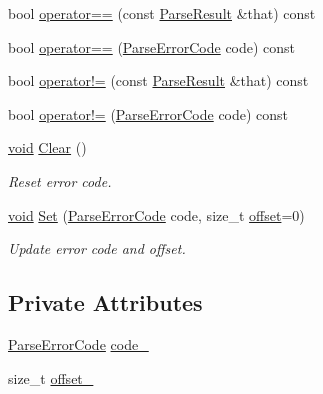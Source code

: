 \begin{DoxyCompactItemize}
bool \hyperlink{structParseResult_a4d98465a5dc6055e367a7ea7089fc73d}{operator==} (const \hyperlink{structParseResult}{Parse\+Result} \&that) const
\item 
bool \hyperlink{structParseResult_a6de18a7e43013b2defc51d892c2cf90f}{operator==} (\hyperlink{group__RAPIDJSON__ERRORS_ga8d4b32dfc45840bca189ade2bbcb6ba7}{Parse\+Error\+Code} code) const
\item 
bool \hyperlink{structParseResult_aa1fcc912cede0ef0526e0cbfcb14e4c2}{operator!=} (const \hyperlink{structParseResult}{Parse\+Result} \&that) const
\item 
bool \hyperlink{structParseResult_afbe78dd07fd1bc09adb1609dda028ee0}{operator!=} (\hyperlink{group__RAPIDJSON__ERRORS_ga8d4b32dfc45840bca189ade2bbcb6ba7}{Parse\+Error\+Code} code) const
\item 
\hyperlink{imgui__impl__opengl3__loader_8h_ac668e7cffd9e2e9cfee428b9b2f34fa7}{void} \hyperlink{structParseResult_a88b6d44f052a19e6436ae6aadc2c40b4}{Clear} ()
\begin{DoxyCompactList}\small\item\em Reset error code. \end{DoxyCompactList}\item 
\hyperlink{imgui__impl__opengl3__loader_8h_ac668e7cffd9e2e9cfee428b9b2f34fa7}{void} \hyperlink{structParseResult_aa81b4a7b776b77216cb752385203a8c1}{Set} (\hyperlink{group__RAPIDJSON__ERRORS_ga8d4b32dfc45840bca189ade2bbcb6ba7}{Parse\+Error\+Code} code, size\+\_\+t \hyperlink{imgui__impl__opengl3__loader_8h_ae1b92ae085ddef4b1cdca7d749339fb0}{offset}=0)
\begin{DoxyCompactList}\small\item\em Update error code and offset. \end{DoxyCompactList}\end{DoxyCompactItemize}
\subsection*{Private Attributes}
\begin{DoxyCompactItemize}
\item 
\hyperlink{group__RAPIDJSON__ERRORS_ga8d4b32dfc45840bca189ade2bbcb6ba7}{Parse\+Error\+Code} \hyperlink{structParseResult_aa30a53c4b7452efb82baf4767cda33fb}{code\+\_\+}
\item 
size\+\_\+t \hyperlink{structParseResult_a4854b4b3210fd1bbc0f1457aa0d2b65a}{offset\+\_\+}
\end{DoxyCompactItemize}
